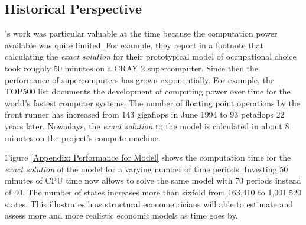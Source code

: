 \subsection{Historical Perspective}\label{Appendix: Historical Perspective}
\citet{Keane.1994}'s work was particular valuable at the time because the computation power available was quite limited. For example, they report in a footnote that calculating the \textit{exact solution} for their prototypical model of occupational choice took roughly 50 minutes on a CRAY 2 supercomputer. Since then the performance of supercomputers has grown exponentially. For example, the TOP500 \citep{TOP500.2017} list documents the development of computing power over time for the world's fastest computer systems. The number of floating point operations by the front runner has increased from 143 gigaflops in June 1994 to 93 petaflops 22 years later. Nowadays, the \textit{exact solution} to the model is calculated in about 8 minutes on the project's compute machine.
%

%
Figure \ref{Appendix: Performance for Model} shows the computation time for the \textit{exact solution} of the model for a varying number of time periods. Investing 50 minutes of CPU time now allows to solve the same model with 70 periods instead of 40. The number of states increases more than sixfold from 163,410 to 1,001,520 states. This illustrates how structural econometricians will able to estimate and assess more and more realistic economic models as time goes by.
